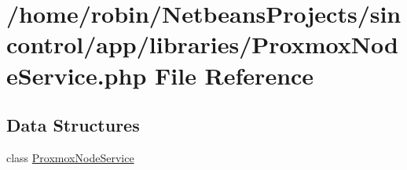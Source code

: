\hypertarget{_proxmox_node_service_8php}{}\section{/home/robin/\+Netbeans\+Projects/sincontrol/app/libraries/\+Proxmox\+Node\+Service.php File Reference}
\label{_proxmox_node_service_8php}
\subsection*{Data Structures}
\begin{DoxyCompactItemize}
\item 
class \hyperlink{class_proxmox_node_service}{Proxmox\+Node\+Service}
\end{DoxyCompactItemize}
